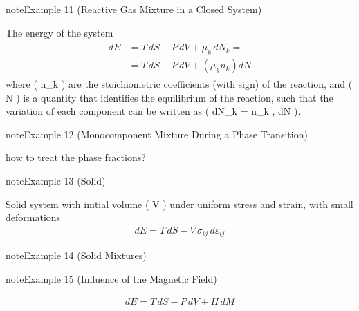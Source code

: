 \documentclass[letterpaper,10pt,english]{jupyterBook}
\begin{document}
\label{ch/principles-gibbs-phase-rule:example-14}
\begin{sphinxadmonition}{note}{Example 11 (Reactive Gas Mixture in a Closed System)}



\sphinxAtStartPar
The energy of the system
\begin{equation*}
\begin{split}
\begin{aligned}
  dE & = T \, dS - P \, dV + \mu_k \, dN_k = \\
     & = T \, dS - P \, dV + \left( \mu_k n_k \right) dN
\end{aligned}
\end{split}
\end{equation*}
\sphinxAtStartPar
where ( n\_k ) are the stoichiometric coefficients (with sign) of the reaction, and ( N ) is a quantity that identifies the equilibrium of the reaction, such that the variation of each component can be written as ( dN\_k = n\_k , dN ).
\end{sphinxadmonition}
\label{ch/principles-gibbs-phase-rule:example-15}
\begin{sphinxadmonition}{note}{Example 12 (Monocomponent Mixture During a Phase Transition)}



\sphinxAtStartPar
{} how to treat the phase fractions?
\end{sphinxadmonition}
\label{ch/principles-gibbs-phase-rule:example-16}
\begin{sphinxadmonition}{note}{Example 13 (Solid)}



\sphinxAtStartPar
Solid system with initial volume ( V ) under uniform stress and strain, with small deformations
\begin{equation*}
\begin{split}
dE = T \, dS - V \, \sigma_{ij} \, d \varepsilon_{ij}
\end{split}
\end{equation*}\end{sphinxadmonition}
\label{ch/principles-gibbs-phase-rule:example-17}
\begin{sphinxadmonition}{note}{Example 14 (Solid Mixtures)}



\sphinxAtStartPar
{}
\end{sphinxadmonition}
\label{ch/principles-gibbs-phase-rule:example-18}
\begin{sphinxadmonition}{note}{Example 15 (Influence of the Magnetic Field)}


\begin{equation*}
\begin{split}
dE = T \, dS - P \, d V + H \, dM
\end{split}
\end{equation*}
\sphinxAtStartPar
{}
\end{sphinxadmonition}
\end{document}
